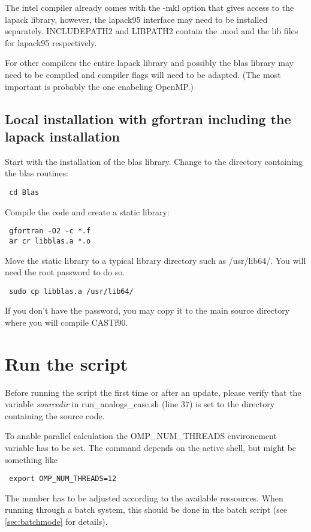 \documentclass[11p,a4paper]{article}
\begin{document}
The intel compiler already comes with the -mkl option that gives access to the lapack library, however, the lapack95 interface may need to be installed separately. INCLUDEPATH2 and LIBPATH2 contain the .mod and the lib files for lapack95 respectively. 

For other compilers the entire lapack library and possibly the blas library may need to be compiled and compiler flags will need to be adapted. (The most important is probably the one enabeling OpenMP.)

\subsection{Local installation with gfortran including the lapack installation}
Start with the installation of the blas library.
Change to the directory containing the blas routines:
\begin{verbatim}
 cd Blas
\end{verbatim}
Compile the code and create a static library:
\begin{verbatim}
 gfortran -O2 -c *.f
 ar cr libblas.a *.o
\end{verbatim}
Move the static library to a typical library directory such as /usr/lib64/. You will need the root password to do so.
\begin{verbatim}
 sudo cp libblas.a /usr/lib64/
\end{verbatim}
If you don't have the password, you may copy it to the main source directory where you will compile CASTf90.

\section{Run the script}
Before running the script the first time or after an update, please verify that the variable \textit{sourcedir} in run\_analogs\_case.sh (line 37) is set to the directory containing the source code.

To anable parallel calculation the OMP\_NUM\_THREADS environement variable has to be set. The command depends on the active shell, but might be something like 
\begin{verbatim}
 export OMP_NUM_THREADS=12
\end{verbatim}
The number has to be adjusted according to the available ressources.
When running through a batch system, this should be done in the batch script (see  \autoref{sec:batchmode} for details).
\end{document}
